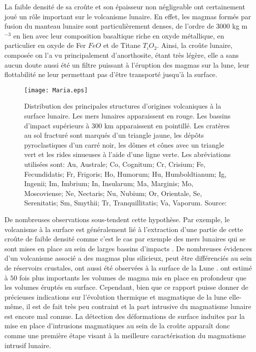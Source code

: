 La faible densité de sa croûte et son épaisseur non négligeable ont
certainement joué un rôle important sur le volcanisme lunaire. En
effet, les magmas formés par fusion du manteau lunaire sont
particulièrement denses, de l'ordre de $3000$ kg m$^{-3}$
\citep{Kiefer:2012kp} en lien avec leur composition basaltique riche
en oxyde métallique, en particulier en oxyde de Fer $FeO$ et de
Titane $T_iO_2$. Ainsi, la croûte lunaire, composée on l'a vu
principalement d'anorthosite, étant très légère, elle a sans aucun
doute aussi été un filtre puissant à l'éruption des magmas sur la
lune, leur flottabilité ne leur permettant pas d'être transporté
jusqu'à la surface.
\begin{figure}[h!]
 \begin{center}
 \graphicspath{ {/Users/thorey/Documents/These/Manuscript/Figure/Chapter1/} }
 \texttt{[image: Maria.eps]}
 \caption{Distribution des principales structures d'origines
 volcaniques à la surface lunaire. Les mers lunaires
 apparaissent en rouge. Les bassins d'impact supérieurs à $300$
 km apparaissent en pointillé. Les cratères au sol fracturé sont
 marqués d'un triangle jaune, les dépôts pyroclastiques d'un
 carré noir, les dômes et cônes avec un triangle vert et les
 rides sinueuses à l'aide d'une ligne verte. Les abréviations
 utilisées sont: Au, Australe; Co, Cognitum; Cr, Crisium; Fe,
 Fecundidatis; Fr, Frigoris; Ho, Humorum; Hu, Humboldtianum; Ig,
 Ingenii; Im, Imbrium; In, Insularum; Ma, Marginis; Mo,
 Moscoviense; Ne, Nectaris; Nu, Nubium; Or, Orientale, Se,
 Serenitatis; Sm, Smythii; Tr, Tranquillitatis; Va, Vaporum.
 Source: \citet{Platz:2015ex}}
 \label{Maria}
 \end{center}
\end{figure}

De nombreuses observations sous-tendent cette hypothèse. Par exemple,
le volcanisme à la surface est généralement lié à l'extraction d'une
partie de cette croûte de faible densité comme c'est le cas par
exemple des mers lunaires qui se sont mises en place au sein de larges
bassins d'impacts \citet{Wieczorek:2001jt}. De nombreuses évidences
d'un volcanisme associé a des magmas plus silicieux, peut être
différenciés au sein de réservoirs crustales, ont aussi été observées
à la surface de la Lune
\citep{Jolliff:2011he,Glotch:2010ih,Glotch:2011tk}.
\citet{Head:1992bk} ont estimé à $50$ fois plus importants les volumes
de magma mis en place en profondeur que les volumes éruptés en
surface. Cependant, bien que ce rapport puisse donner de précieuses
indications sur l'évolution thermique et magmatique de la lune
elle-même, il est de fait très peu contraint et la part intrusive du
magmatisme lunaire est encore mal connue. La détection des
déformations de surface induites par la mise en place d'intrusions
magmatiques au sein de la croûte apparaît donc comme une première
étape visant à la meilleure caractérisation du magmatisme intrusif
lunaire.

